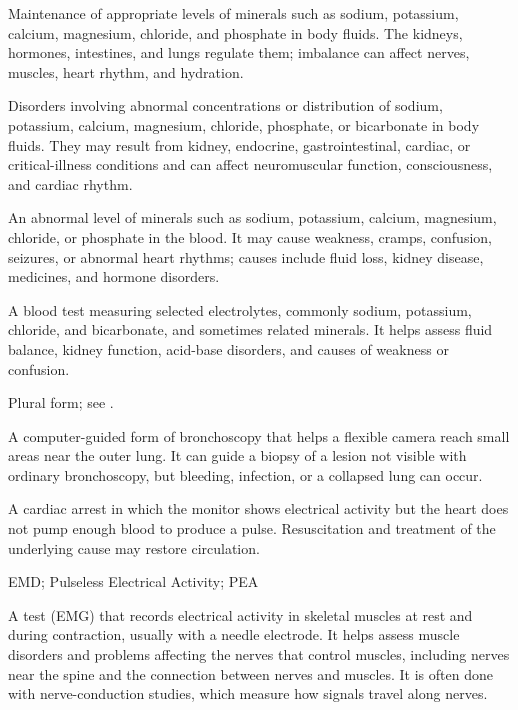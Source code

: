  Maintenance of appropriate levels of minerals such as sodium, potassium, calcium, magnesium, chloride, and phosphate in body fluids. The kidneys, hormones, intestines, and lungs regulate them; imbalance can affect nerves, muscles, heart rhythm, and hydration.

 Disorders involving abnormal concentrations or distribution of sodium, potassium, calcium, magnesium, chloride, phosphate, or bicarbonate in body fluids. They may result from kidney, endocrine, gastrointestinal, cardiac, or critical-illness conditions and can affect neuromuscular function, consciousness, and cardiac rhythm.

 An abnormal level of minerals such as sodium, potassium, calcium, magnesium, chloride, or phosphate in the blood. It may cause weakness, cramps, confusion, seizures, or abnormal heart rhythms; causes include fluid loss, kidney disease, medicines, and hormone disorders.

 A blood test measuring selected electrolytes, commonly sodium, potassium, chloride, and bicarbonate, and sometimes related minerals. It helps assess fluid balance, kidney function, acid-base disorders, and causes of weakness or confusion.

 Plural form; see .

 A computer-guided form of bronchoscopy that helps a flexible camera reach small areas near the outer lung. It can guide a biopsy of a lesion not visible with ordinary bronchoscopy, but bleeding, infection, or a collapsed lung can occur.

 A cardiac arrest in which the monitor shows electrical activity but the heart does not pump enough blood to produce a pulse. Resuscitation and treatment of the underlying cause may restore circulation.

\synonyms
EMD; Pulseless Electrical Activity; PEA

 A test (EMG) that records electrical activity in skeletal muscles at rest and during contraction, usually with a needle electrode. It helps assess muscle disorders and problems affecting the nerves that control muscles, including nerves near the spine and the connection between nerves and muscles. It is often done with nerve-conduction studies, which measure how signals travel along nerves.

